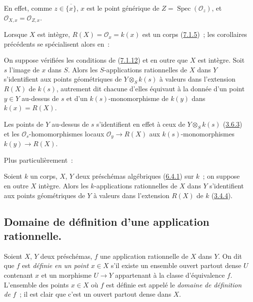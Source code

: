En effet, comme $z\in\overline{\{x\}}$, $x$ est le point générique de
$Z=\operatorname{Spec}(\mathscr{O}_z)$, et
$\mathscr{O}_{X,x}=\mathscr{O}_{Z,x}$.

Lorsque $X$ est intègre, $R(X)=\mathscr{O}_x=k(x)$ est un corps
(\hyperref[I.7.1.5-fr]{7.1.5})~; les corollaires précédents se spécialisent
alors en~:

\begin{corollary}[7.1.15]
\label{I.7.1.15-fr}
On suppose vérifiées les conditions de (\hyperref[I.7.1.12-fr]{7.1.12}) et en
outre que $X$ est intègre. Soit $s$ l'image de $x$ dans $S$. Alors les
$S$-applications rationnelles de $X$ dans $Y$ s'identifient aux points
géométriques de $Y\otimes_S k(s)$ à valeurs dans l'extension $R(X)$ de $k(s)$,
autrement dit chacune d'elles équivaut à la donnée d'un point $y\in Y$
au-dessus de $s$ et d'un $k(s)$-monomorphisme de $k(y)$ dans
$k(x)=R(X)$.
\end{corollary}

Les points de $Y$ au-dessus de $s$ s'identifient en effet à ceux de
$Y\otimes_S k(s)$ (\hyperref[I.3.6.3-fr]{3.6.3}) et les
$\mathscr{O}_s$-homomorphismes locaux $\mathscr{O}_y\to R(X)$ aux
$k(s)$-monomorphismes $k(y)\to R(X)$.

Plus particulièrement~:

\begin{corollary}[7.1.16]
\label{I.7.1.16-fr}
Soient $k$ un corps, $X$, $Y$ deux préschémas algébriques
(\hyperref[I.6.4.1-fr]{6.4.1}) sur $k$~; on suppose en outre $X$ intègre. Alors
les $k$-applications rationnelles de $X$ dans $Y$ s'identifient aux points
géométriques de $Y$ à valeurs dans l'extension $R(X)$ de $k$
(\hyperref[I.3.4.4-fr]{3.4.4}).
\end{corollary}

\subsection{Domaine de définition d'une application rationnelle.}
\label{subsection:I.7.2-fr}

\begin{env}[7.2.1]
\label{I.7.2.1-fr}
Soient $X$, $Y$ deux préschémas, $f$ une application rationnelle de $X$ dans
$Y$. On dit que $f$ est \emph{définie en un point $x\in X$} s'il existe un
ensemble ouvert partout dense $U$ contenant $x$ et un morphisme $U\to Y$
appartenant à la classe d'équivalence $f$. L'ensemble des points $x\in X$ où
$f$ est définie est appelé le \emph{domaine de définition de $f$}~; il est
clair que c'est un ouvert partout dense dans $X$.
\end{env}

